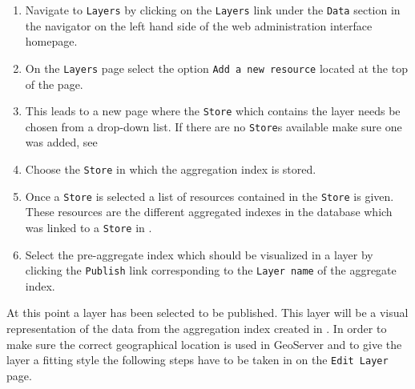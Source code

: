 \begin{enumerate}
	\item Navigate to \lstinline|Layers| by clicking on the \lstinline|Layers| link under the \lstinline|Data| section in the navigator on the left hand side of the web administration interface homepage.
	\item On the \lstinline|Layers| page select the option \lstinline|Add a new resource| located at the top of the page.
	\item This leads to a new page where the \lstinline|Store| which contains the layer needs be chosen from a drop-down list. If there are no \lstinline|Store|s available make sure one was added, see  
	\item Choose the \lstinline|Store| in which the aggregation index is stored.
	\item Once a \lstinline|Store| is selected a list of resources contained in the \lstinline|Store| is given. These resources are the different aggregated indexes in the database which was linked to a \lstinline|Store| in .
	\item Select the pre-aggregate index which should be visualized in a layer by clicking the \lstinline|Publish| link corresponding to the \lstinline|Layer name| of the aggregate index.
\end{enumerate}

\noindent At this point a layer has been selected to be published. This layer will be a visual representation of the data from the aggregation index created in . In order to make sure the correct geographical location is used in GeoServer and to give the layer a fitting style the following steps have to be taken in on the \lstinline|Edit Layer| page.

